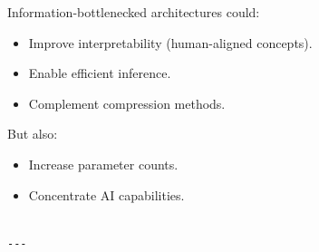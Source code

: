 Information-bottlenecked architectures could:
\begin{itemize}
\item Improve interpretability (human-aligned concepts).
\item Enable efficient inference.
\item Complement compression methods.

\end{itemize}
But also:
\begin{itemize}
\item Increase parameter counts.
\item Concentrate AI capabilities.
\end{itemize}
\begin{lstlisting}

---
\end{lstlisting}